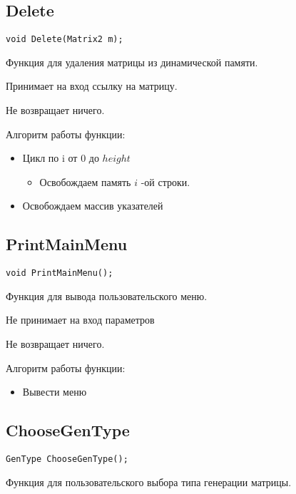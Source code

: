 \subsection*{Delete}

\begin{lstlisting}[label={lst:Delete}]
	void Delete(Matrix2 m);
\end{lstlisting}

Функция для удаления матрицы из динамической памяти.

Принимает на вход ссылку на матрицу.

Не возвращает ничего.

Алгоритм работы функции:

\begin{itemize}
	\item Цикл по i от 0 до $ height $
	\begin{itemize}
		\item Освобождаем память $ i $ -ой строки.
	\end{itemize}
	\item Освобождаем массив указателей
\end{itemize}

\subsection*{PrintMainMenu}

\begin{lstlisting}[label={lst:PrintMainMenu}]
	void PrintMainMenu();
\end{lstlisting}

Функция для вывода пользовательского меню.

Не принимает на вход параметров

Не возвращает ничего.

Алгоритм работы функции:

\begin{itemize}
	\item Вывести меню
\end{itemize}

\subsection*{ChooseGenType}

\begin{lstlisting}[label={lst:ChooseGenType}]
	GenType ChooseGenType();
\end{lstlisting}

Функция для пользовательского выбора типа генерации матрицы.

